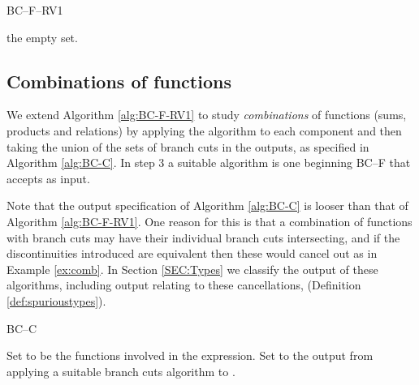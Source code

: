 \documentclass{llncs}
\begin{document}
\begin{algorithm}[ht] \caption{BC--F--RV1} \label{alg:BC-F-RV1}
\DontPrintSemicolon
{}
\BlankLine
{}
{\Return the empty set. \;}
\end{algorithm}

\subsection{Combinations of functions}

We extend Algorithm \ref{alg:BC-F-RV1} to study {\em combinations} of functions (sums, products and relations) by applying the algorithm to each component and then taking the union of the sets of branch cuts in the outputs, as specified in Algorithm \ref{alg:BC-C}.  In step 3 a suitable algorithm is one beginning BC--F that accepts  as input.

Note that the output specification of Algorithm \ref{alg:BC-C} is looser than that of Algorithm \ref{alg:BC-F-RV1}.  One reason for this is that a combination of functions with branch cuts may have their individual branch cuts intersecting, and if the discontinuities introduced are equivalent then these would cancel out as in Example \ref{ex:comb}.  In Section \ref{SEC:Types} we classify the output of these algorithms, including output relating to these cancellations, (Definition \ref{def:spurioustypes}).
 
\begin{algorithm}[ht] \caption{BC--C} \label{alg:BC-C}
\DontPrintSemicolon
{}
\BlankLine
Set  to be the functions involved in the expression. \;
\For{}
{Set  to the output from applying a suitable branch cuts algorithm to .}
\Return  
\end{algorithm}
\end{document}
